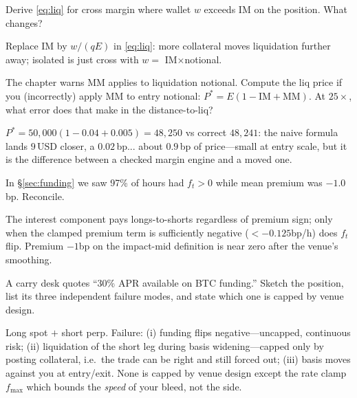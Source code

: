 \begin{exercise}
Derive \eqref{eq:liq} for cross margin where wallet $w$ exceeds IM on the position. What
changes?
\end{exercise}
\begin{solution}
Replace IM by $w/(qE)$ in \eqref{eq:liq}: more collateral moves liquidation further away;
isolated is just cross with $w=$ IM$\times$notional.
\end{solution}

\begin{exercise}\label{ex:liqex}
The chapter warns MM applies to liquidation notional. Compute the liq price if you
(incorrectly) apply MM to entry notional: $P^*=E(1-\mathrm{IM}+\mathrm{MM})$. At $25\times$,
what error does that make in the distance-to-liq?
\end{exercise}
\begin{solution}
$P^*=50{,}000(1-0.04+0.005)=48{,}250$ vs correct $48{,}241$: the naive formula lands $9$\,USD
closer, a $0.02$\,bp... about $0.9$\,bp of price---small at entry scale, but it is the
difference between a checked margin engine and a moved one.
\end{solution}

\begin{exercise}
In \S\ref{sec:funding} we saw 97\% of hours had $f_t>0$ while mean premium was $-1.0$\,bp.
Reconcile.
\end{exercise}
\begin{solution}
The interest component pays longs-to-shorts regardless of premium sign; only when the
clamped premium term is sufficiently negative ($<-0.125$bp/h) does $f_t$ flip. Premium $-1$bp
on the impact-mid definition is near zero after the venue's smoothing.
\end{solution}

\begin{exercise}
A carry desk quotes ``30\% APR available on BTC funding.'' Sketch the position, list its three
independent failure modes, and state which one is capped by venue design.
\end{exercise}
\begin{solution}
Long spot $+$ short perp. Failure: (i) funding flips negative---uncapped, continuous risk;
(ii) liquidation of the short leg during basis widening---capped only by posting collateral,
i.e.\ the trade can be right and still forced out; (iii) basis moves against you at
entry/exit. None is capped by venue design except the rate clamp $f_{\max}$ which bounds the
\emph{speed} of your bleed, not the side.
\end{solution}

